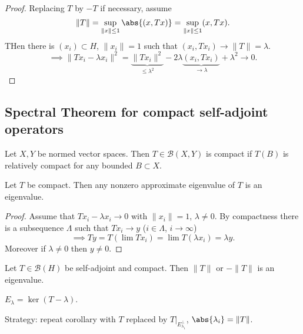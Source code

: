 \documentclass{article}
\begin{document}
\begin{proof}
    Replacing $T$ by $-T$ if necessary, assume
    \begin{equation*}
        \|T\| = \sup_{\|x\| \leq 1} \abs{(x, Tx)} = \sup_{\|x\| \leq 1} (x, Tx).
    \end{equation*}
    THen there is $(x_i) \subset H$, $\|x_i\| = 1$ such that $(x_i, T x_i) \to \|T\| = \lambda$.
    \begin{equation*}
        \implies \|T x_i - \lambda x_i\|^2 = \underbrace{\|T x_i\|^2}_{\leq \lambda^2} - 2 \lambda \underbrace{(x_i, T x_i)}_{\to \lambda} + \lambda^2 \to 0.
    \end{equation*}
\end{proof}

\subsection{Spectral Theorem for compact self-adjoint operators}
\begin{defi}
    Let $X, Y$ be normed vector spaces.
    Then $T \in \mathcal{B}(X, Y)$ is compact if $T(B)$ is relatively compact for any bounded $B \subset X$.
\end{defi}

\begin{lemma}
    Let $T$ be compact. Then any nonzero approximate eigenvalue of $T$ is an eigenvalue.
\end{lemma}

\begin{proof}
    Assume that $T x_i - \lambda x_i \to 0$ with $\|x_i\| = 1$, $\lambda \neq 0$.
    By compactness there is a subsequence $\Lambda$ such that $T x_i \to y$ ($i \in \Lambda$, $i \to \infty$)
    \begin{equation*}
        \implies T y = T(\lim T x_i) = \lim T (\lambda x_i) = \lambda y.
    \end{equation*}
    Moreover if $\lambda \neq 0$ then $y \neq 0$.
\end{proof}

\begin{cor}
    Let $T \in \mathcal{B}(H)$ be self-adjoint and compact. Then $\|T\|$ or $- \|T\|$ is an eigenvalue.
\end{cor}

\begin{notation}
    $E_\lambda = \ker(T - \lambda)$.
\end{notation}
Strategy: repeat corollary with $T$ replaced by $T|_{E_{\lambda_1}^\perp}$, $\abs{\lambda_i} = \|T\|$.
\end{document}
